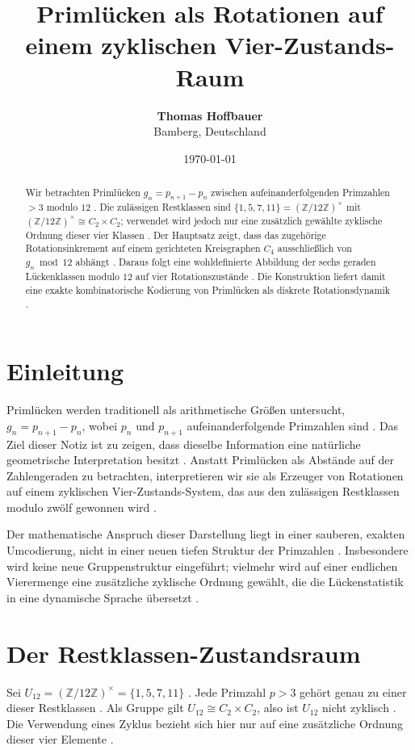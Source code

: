 \documentclass[11pt,a4paper]{article}
\title{\textbf{Primlücken als Rotationen auf einem zyklischen Vier-Zustands-Raum}}
\author{\textbf{Thomas Hoffbauer} \\ \small Bamberg, Deutschland}
\date{\today}
\begin{document}
	
	\maketitle
	
	\begin{abstract}
		Wir betrachten Primlücken $g_n=p_{n+1}-p_n$ zwischen aufeinanderfolgenden Primzahlen $>3$ modulo $12$ \cite{hofbauer_gap}. Die zulässigen Restklassen sind $\{1,5,7,11\}=(\mathbb{Z}/12\mathbb{Z})^\times$ mit $(\mathbb{Z}/12\mathbb{Z})^\times\cong C_2\times C_2$; verwendet wird jedoch nur eine zusätzlich gewählte zyklische Ordnung dieser vier Klassen \cite{hofbauer_gap}. Der Hauptsatz zeigt, dass das zugehörige Rotationsinkrement auf einem gerichteten Kreisgraphen $C_4$ ausschließlich von $g_n\bmod 12$ abhängt \cite{hofbauer_gap}. Daraus folgt eine wohldefinierte Abbildung der sechs geraden Lückenklassen modulo $12$ auf vier Rotationszustände \cite{hofbauer_gap}. Die Konstruktion liefert damit eine exakte kombinatorische Kodierung von Primlücken als diskrete Rotationsdynamik \cite{hofbauer_gap}.
	\end{abstract}
	
	\section{Einleitung}
	Primlücken werden traditionell als arithmetische Größen untersucht, $g_n = p_{n+1}-p_n$, wobei $p_n$ und $p_{n+1}$ aufeinanderfolgende Primzahlen sind \cite{hofbauer_gap}. Das Ziel dieser Notiz ist zu zeigen, dass dieselbe Information eine natürliche geometrische Interpretation besitzt \cite{hofbauer_gap}. Anstatt Primlücken als Abstände auf der Zahlengeraden zu betrachten, interpretieren wir sie als Erzeuger von Rotationen auf einem zyklischen Vier-Zustands-System, das aus den zulässigen Restklassen modulo zwölf gewonnen wird \cite{hofbauer_gap}.
	
	Der mathematische Anspruch dieser Darstellung liegt in einer sauberen, exakten Umcodierung, nicht in einer neuen tiefen Struktur der Primzahlen \cite{hofbauer_gap}. Insbesondere wird keine neue Gruppenstruktur eingeführt; vielmehr wird auf einer endlichen Vierermenge eine zusätzliche zyklische Ordnung gewählt, die die Lückenstatistik in eine dynamische Sprache übersetzt \cite{hofbauer_gap}.
	
	\section{Der Restklassen-Zustandsraum}
	Sei $U_{12} = (\mathbb{Z}/12\mathbb{Z})^\times = \{1,5,7,11\}$ \cite{hofbauer_gap}. Jede Primzahl $p>3$ gehört genau zu einer dieser Restklassen \cite{hofbauer_gap}. Als Gruppe gilt $U_{12}\cong C_2\times C_2$, also ist $U_{12}$ nicht zyklisch \cite{hofbauer_gap}. Die Verwendung eines Zyklus bezieht sich hier nur auf eine zusätzliche Ordnung dieser vier Elemente \cite{hofbauer_gap}.
	
\end{document}
